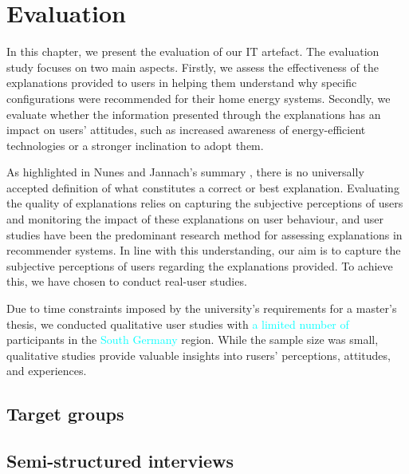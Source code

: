 \chapter{Evaluation}

In this chapter, we present the evaluation of our IT artefact. 
The evaluation study focuses on two main aspects. 
Firstly, we assess the effectiveness of the explanations provided to users in helping them understand why specific configurations were recommended for their home energy systems.
Secondly, we evaluate whether the information presented through the explanations has an impact on users' attitudes, such as increased awareness of energy-efficient technologies or a stronger inclination to adopt them. 
 
As highlighted in Nunes and Jannach's summary \cite{Nunes2020}, 
there is no universally accepted definition of what constitutes a correct or best explanation. 
Evaluating the quality of explanations relies on capturing the subjective perceptions of users and monitoring the impact of these explanations on user behaviour, 
and user studies have been the predominant research method for assessing explanations in recommender systems.
In line with this understanding, our aim is to capture the subjective perceptions of users regarding the explanations provided. To achieve this, we have chosen to conduct real-user studies. 

Due to time constraints imposed by the university's requirements for a master's thesis, we conducted qualitative user studies with \textcolor{cyan}{a limited number of} participants in the \textcolor{cyan}{South Germany} region. 
While the sample size was small, qualitative studies provide valuable insights into rusers' perceptions, attitudes, and experiences.


\section{Target groups}



\section{Semi-structured interviews}


